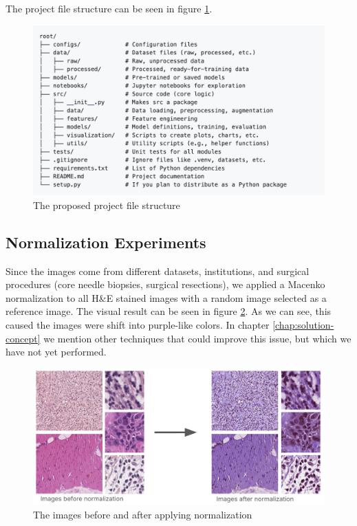 The project file structure can be seen in figure \ref{fig:project-structure}.

\begin{figure}[H]
    \begin{centering}
    \includegraphics[width=14cm]{assets/images/project-structure.png}
    \par\end{centering}
    \caption{The proposed project file structure}
    \label{fig:project-structure}
\end{figure}

\subsection{Normalization Experiments}
Since the images come from different datasets, institutions, and surgical procedures (core needle biopsies, surgical resections), we applied a Macenko normalization to all H\&E stained images with a random image selected as a reference image. The visual result can be seen in figure \ref{fig:work-norm}. As we can see, this caused the images were shift into purple-like colors. In chapter \ref{chap:solution-concept} we mention other techniques that could improve this issue, but which we have not yet performed.

\begin{figure}[H]
    \begin{centering}
    \includegraphics[width=14cm]{assets/images/work-normalization.png}
    \par\end{centering}
    \caption{The images before and after applying normalization}
    \label{fig:work-norm}
\end{figure}

